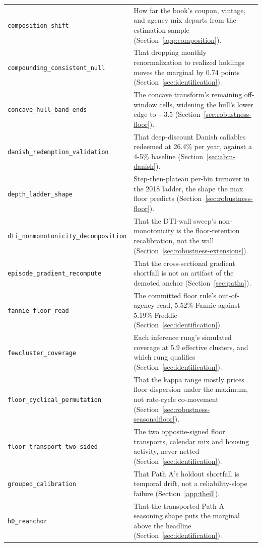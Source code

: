 \documentclass[12pt]{article}
\begin{document}
{\begin{longtable}{@{}p{5.4cm}p{8.8cm}@{}}
\texttt{composition\_shift} & How far the book's coupon, vintage, and agency mix departs from the estimation sample (Section~\ref{app:composition}). \\
\texttt{compounding\_consistent\_null} & That dropping monthly renormalization to realized holdings moves the marginal by 0.74 points (Section~\ref{sec:identification}). \\
\texttt{concave\_hull\_band\_ends} & The concave transform's remaining off-window cells, widening the hull's lower edge to +3.5 (Section~\ref{sec:robustness-floor}). \\
\texttt{danish\_redemption\_validation} & That deep-discount Danish callables redeemed at 26.4\% per year, against a 4-5\% baseline (Section~\ref{sec:abm-danish}). \\
\texttt{depth\_ladder\_shape} & Step-then-plateau per-bin turnover in the 2018 ladder, the shape the max floor predicts (Section~\ref{sec:robustness-floor}). \\
\texttt{dti\_nonmonotonicity\_decomposition} & That the DTI-wall sweep's non-monotonicity is the floor-retention recalibration, not the wall (Section~\ref{sec:robustness-extensions}). \\
\texttt{episode\_gradient\_recompute} & That the cross-sectional gradient shortfall is not an artifact of the demoted anchor (Section~\ref{sec:patha}). \\
\texttt{fannie\_floor\_read} & The committed floor rule's out-of-agency read, 5.52\% Fannie against 5.19\% Freddie (Section~\ref{sec:identification}). \\
\texttt{fewcluster\_coverage} & Each inference rung's simulated coverage at 5.9 effective clusters, and which rung qualifies (Section~\ref{sec:identification}). \\
\texttt{floor\_cyclical\_permutation} & That the kappa range mostly prices floor dispersion under the maximum, not rate-cycle co-movement (Section~\ref{sec:robustness-seasonalfloor}). \\
\texttt{floor\_transport\_two\_sided} & The two opposite-signed floor transports, calendar mix and housing activity, never netted (Section~\ref{sec:identification}). \\
\texttt{grouped\_calibration} & That Path A's holdout shortfall is temporal drift, not a reliability-slope failure (Section~\ref{app:theil}). \\
\texttt{h0\_reanchor} & That the transported Path A seasoning shape puts the marginal above the headline (Section~\ref{sec:identification}). \\

\end{longtable}}
\end{document}
